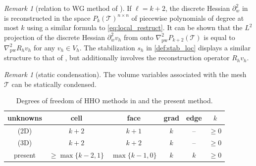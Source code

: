 \documentclass[a4paper]{amsart}
\numberwithin{equation}{section}
\def\T{\mathcal{T}}
\def\pw{\mathrm{pw}}
\theoremstyle{definition}
\theoremstyle{remark}
\newtheorem{remark}[theorem]{Remark}
\numberwithin{theorem}{section}
\numberwithin{equation}{section}
\numberwithin{table}{section}
\numberwithin{figure}{section}
\begin{document}
\begin{remark}[relation to WG method of \cite{LiWangWangZhang2024}]
    If $\ell = k + 2$, the discrete Hessian $\partial^2_w$ in \cite{LiWangWangZhang2024} is reconstructed in the space $P_k(\mathcal{T})^{n \times n}$ of piecewise polynomials of degree at most $k$ using a similar formula to \eqref{eq:local_restruct}. It can be shown that the $L^2$ projection of the discrete Hessian $\partial_w^2 v_h$ from \cite{LiWangWangZhang2024} onto $\nabla^2_\pw P_{k+2}(\mathcal{T})$ is equal to $\nabla^2_\pw R_h v_h$ for any $v_h \in V_h$. The stabilization $s_h$ in \eqref{def:stab_loc} displays a similar structure to that of \cite{LiWangWangZhang2024}, but additionally involves the reconstruction operator $R_h v_h$.
\end{remark}
\begin{remark}[static condensation]
	The volume variables associated with the mesh $\T$ can be statically condensed. 
\end{remark}
\begin{table}[ht!]
    \centering
    \begin{tabular}{|c|cccc|c|}
        \hline
        unknowns & cell & face & grad & edge & $k$\\
        \hline
        \cite{DongErn2022} (2D) & $k+2$ & $k+1$ & $k$ & -- & $\geq 0$\\
        \cite{DongErn2022} (3D) & $k+2$ & $k+2$ & $k$ & -- & $\geq 0$\\
        \hline
        present & $\geq \max\{k-2,1\}$ & $\max\{k-1,0\}$ & $k$ & $k$ & $\geq 0$\\
        \hline
    \end{tabular}
    \captionsetup{width=1\linewidth}
    \caption{Degrees of freedom of HHO methods in \cite{DongErn2022} and the present method.}
    \label{tab:dof}
\end{table}
\end{document}
